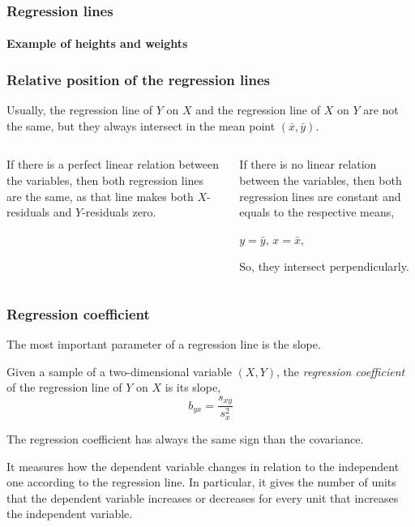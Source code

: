 \begin{frame}
\frametitle{Regression lines}
\framesubtitle{Example of heights and weights}
\begin{center}
\resizebox{0.9\textwidth}{!}{}
\end{center}
\end{frame}


\begin{frame}
\frametitle{Relative position of the regression lines}
Usually, the regression line of $Y$ on $X$ and the regression line of $X$
on $Y$ are not the same, but they always intersect in the mean point $(\bar x,\bar y)$.
\medskip
\begin{columns}[t]
\begin{column}{0.48\textwidth}
If there is a perfect linear relation between the variables, then both regression lines are the same, as that line
makes both $X$-residuals and $Y$-residuals zero.
\begin{center}
\resizebox{0.9\textwidth}{!}{}
\end{center}
\end{column}
\begin{column}{0.48\textwidth}
If there is no linear relation between the variables, then both regression lines are constant and equals to the
respective means, 
\begin{center}
$y = \bar y$, \qquad $x = \bar x,$
\end{center}
So, they intersect perpendicularly.
\begin{center}
\resizebox{0.9\textwidth}{!}{}
\end{center}
\end{column}
\end{columns}
\end{frame}


\begin{frame}
\frametitle{Regression coefficient}
The most important parameter of a regression line is the slope. 

\begin{definition}
Given a sample of a two-dimensional variable $(X,Y)$, the \emph{regression coefficient} of the regression line of $Y$ on
$X$ is its slope,
\[
b_{yx} = \frac{s_{xy}}{s_x^2}
\]
\end{definition}

The regression coefficient has always the same sign than the covariance. 

It measures how the dependent variable changes in relation to the independent one according to the regression line. 
In particular, it gives the number of units that the dependent variable increases or decreases for every unit that
increases the independent variable. 
\end{frame}


